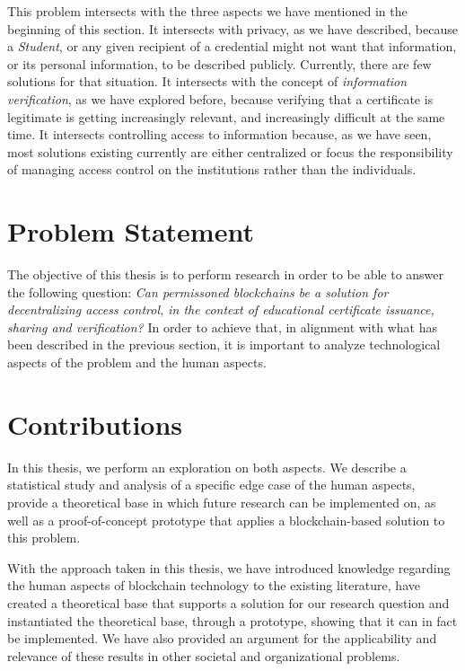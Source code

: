 This problem intersects with the three aspects we have mentioned in the beginning of this section. It intersects with privacy, as we have described, because a \textit{Student}, or any given recipient of a credential might not want that information, or its personal information, to be described publicly. Currently, there are few solutions for that situation. It intersects with the concept of \textit{information verification}, as we have explored before, because verifying that a certificate is legitimate is getting increasingly relevant, and increasingly difficult at the same time. It intersects controlling access to information because, as we have seen, most solutions existing currently are either centralized or focus the responsibility of managing access control on the institutions rather than the individuals.

\section{Problem Statement}

The objective of this thesis is to perform research in order to be able to answer the following question: \textit{Can permissoned blockchains be a solution for decentralizing access control, in the context of educational certificate issuance, sharing and verification?} In order to achieve that, in alignment with what has been described in the previous section, it is important to analyze technological aspects of the problem and the human aspects.

\section{Contributions}
\label{sec:contributions}

In this thesis, we perform an exploration on both aspects. We describe a statistical study and analysis of a specific edge case of the human aspects, provide a theoretical base in which future research can be implemented on, as well as a proof-of-concept prototype that applies a blockchain-based solution to this problem.

With the approach taken in this thesis, we have introduced knowledge regarding the human aspects of blockchain technology to the existing literature, have created a theoretical base that supports a solution for our research question and instantiated the theoretical base, through a prototype, showing that it can in fact be implemented. We have also provided an argument for the applicability and relevance of these results in other societal and organizational problems.

